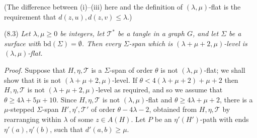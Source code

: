 (The difference between (i)--(iii) here and the definition of $(\lambda, \mu)$-flat is the requirement that $d(z, u), d(z, v) \le \lambda$.)

\stmt
(8.3) \textit{Let $\lambda, \mu \ge 0$ be integers, let $\mathcal{T}^*$ be a tangle in a graph $G$, and let $\Sigma$ be a surface with $\text{bd}(\Sigma) = \emptyset$. Then every $\Sigma$-span which is $(\lambda + \mu + 2, \mu)$-level is $(\lambda, \mu)$-flat.}

\textit{Proof.} Suppose that $H, \eta, \mathcal{T}$ is a $\Sigma$-span of order $\theta$ is not $(\lambda, \mu)$-flat; we shall show that it is not $(\lambda + \mu + 2, \mu)$-level. If $\theta < 4(\lambda + \mu + 2) + \mu + 2$ then $H, \eta, \mathcal{T}$ is not $(\lambda + \mu + 2, \mu)$-level as required, and so we assume that $\theta \ge 4\lambda + 5\mu + 10$. Since $H, \eta, \mathcal{T}$ is not $(\lambda, \mu)$-flat and $\theta \ge 4\lambda + \mu + 2$, there is a $\mu$-stepped $\Sigma$-span $H', \eta', \mathcal{T}'$ of order $\theta - 4\lambda - 2$, obtained from $H, \eta, \mathcal{T}$ by rearranging within $\lambda$ of some $z \in A(H)$. Let $P$ be an $\eta'(H')$-path with ends $\eta'(a), \eta'(b)$, such that $d'(a, b) \ge \mu$.
